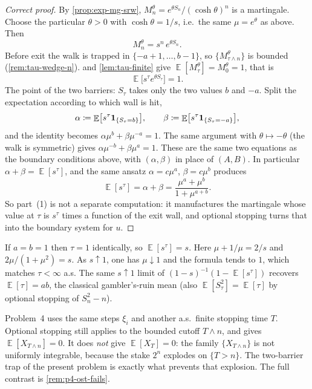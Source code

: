 \documentclass[11pt,a4paper]{article}
\DeclareMathOperator{\E}{\mathbb{E}}
\begin{document}
\begin{proof}[Correct proof]
By \cref{prop:exp-mg-srw}, \( M_n^{\theta}=e^{\theta S_n}/(\cosh\theta)^{n} \) is a martingale. Choose the particular \( \theta>0 \) with \( \cosh\theta=1/s \), i.e.\ the same \( \mu=e^{\theta} \) as above. Then
\[
M_n^{\theta}
=
s^{n}\,e^{\theta S_n}.
\]
Before exit the walk is trapped in \( \{-a+1,\dots,b-1\} \), so \( \{M_{\tau\wedge n}^{\theta}\} \) is bounded (\cref{rem:tau-wedge-n}).  and \cref{lem:tau-finite} give \( \E[M_{\tau}^{\theta}]=M_0^{\theta}=1 \), that is
\[
\E\bigl[s^{\tau}e^{\theta S_{\tau}}\bigr]
=
1.
\]
The point of the two barriers: \( S_{\tau} \) takes only the two values \( b \) and \( -a \). Split the expectation according to which wall is hit,
\[
\alpha
\coloneqq
\E\bigl[s^{\tau}\ind_{\{S_{\tau}=b\}}\bigr],
\qquad
\beta
\coloneqq
\E\bigl[s^{\tau}\ind_{\{S_{\tau}=-a\}}\bigr],
\]
and the identity becomes \( \alpha\mu^{b}+\beta\mu^{-a}=1 \). The same argument with \( \theta\mapsto-\theta \) (the walk is symmetric) gives \( \alpha\mu^{-b}+\beta\mu^{a}=1 \). These are the same two equations as the boundary conditions above, with \( (\alpha,\beta) \) in place of \( (A,B) \). In particular \( \alpha+\beta=\E[s^{\tau}] \), and the same ansatz \( \alpha=c\mu^{a} \), \( \beta=c\mu^{b} \) produces
\[
\E[s^{\tau}]
=
\alpha+\beta
=
\frac{\mu^{a}+\mu^{b}}{1+\mu^{a+b}}.
\]
So part~(1) is not a separate computation: it manufactures the martingale whose value at \( \tau \) is \( s^{\tau} \) times a function of the exit wall, and optional stopping turns that into the boundary system for \( u \).
\end{proof}

\begin{remark}
\label{rem:p3-checks}
If \( a=b=1 \) then \( \tau=1 \) identically, so \( \E[s^{\tau}]=s \). Here \( \mu+1/\mu=2/s \) and \( 2\mu/(1+\mu^{2})=s \). As \( s\uparrow 1 \), one has \( \mu\downarrow 1 \) and the formula tends to \( 1 \), which matches \( \tau<\infty \) a.s. The same \( s\uparrow 1 \) limit of \( (1-s)^{-1}(1-\E[s^{\tau}]) \) recovers \( \E[\tau]=ab \), the classical gambler's-ruin mean (also \( \E[S_{\tau}^{2}]=\E[\tau] \) by optional stopping of \( S_n^{2}-n \)).
\end{remark}

\begin{remark}
\label{rem:p3-vs-p4-ost}
Problem~4 uses the same steps \( \xi_i \) and another a.s.\ finite stopping time \( T \). Optional stopping still applies to the bounded cutoff \( T\wedge n \), and gives \( \E[X_{T\wedge n}]=0 \). It does \emph{not} give \( \E[X_T]=0 \): the family \( \{X_{T\wedge n}\} \) is not uniformly integrable, because the stake \( 2^{n} \) explodes on \( \{T>n\} \). The two-barrier trap of the present problem is exactly what prevents that explosion. The full contrast is \cref{rem:p4-ost-fails}.
\end{remark}
\end{document}
